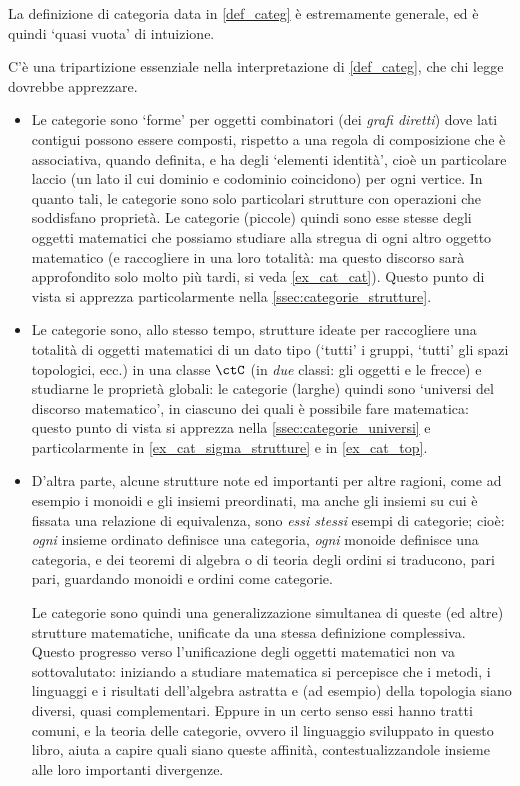 La definizione di categoria data in \ref{def_categ} è estremamente generale, ed è quindi `quasi vuota' di intuizione.

C'è una tripartizione essenziale nella interpretazione di \ref{def_categ}, che chi legge dovrebbe apprezzare.
\begin{itemize}
 \item Le categorie sono `forme' per oggetti combinatori (dei \emph{grafi diretti}) dove lati contigui possono essere composti, rispetto a una regola di composizione che è associativa, quando definita, e ha degli `elementi identità', cioè un particolare laccio (un lato il cui dominio e codominio coincidono) per ogni vertice. In quanto tali, le categorie sono solo particolari strutture con operazioni che soddisfano proprietà. Le categorie (piccole) quindi sono esse stesse degli oggetti matematici che possiamo studiare alla stregua di ogni altro oggetto matematico (e raccogliere in una loro totalità: ma questo discorso sarà approfondito solo molto più tardi, si veda \ref{ex_cat_cat}). Questo punto di vista si apprezza particolarmente nella \autoref{ssec:categorie_strutture}.
 \item Le categorie sono, allo stesso tempo, strutture ideate per raccogliere una totalità di oggetti matematici di un dato tipo (`tutti' i gruppi, `tutti' gli spazi topologici, ecc.) in una classe \(\ctC\) (in \emph{due} classi: gli oggetti e le frecce) e studiarne le proprietà globali: le categorie (larghe) quindi sono `universi del discorso matematico', in ciascuno dei quali è possibile fare matematica: questo punto di vista si apprezza nella \autoref{ssec:categorie_universi} e particolarmente in \ref{ex_cat_sigma_strutture} e in \ref{ex_cat_top}.
 \item D'altra parte, alcune strutture note ed importanti per altre ragioni, come ad esempio i monoidi e gli insiemi preordinati, ma anche gli insiemi su cui è fissata una relazione di equivalenza, sono \emph{essi stessi} esempi di categorie; cioè: \emph{ogni} insieme ordinato definisce una categoria, \emph{ogni} monoide definisce una categoria, e dei teoremi di algebra o di teoria degli ordini si traducono, pari pari, guardando monoidi e ordini come categorie.

       Le categorie sono quindi una generalizzazione simultanea di queste (ed altre) strutture matematiche, unificate da una stessa definizione complessiva. Questo progresso verso l'unificazione degli oggetti matematici non va sottovalutato: iniziando a studiare matematica si percepisce che i metodi, i linguaggi e i risultati dell'algebra astratta e (ad esempio) della topologia siano diversi, quasi complementari. Eppure in un certo senso essi hanno tratti comuni, e la teoria delle categorie, ovvero il linguaggio sviluppato in questo libro, aiuta a capire quali siano queste affinità, contestualizzandole insieme alle loro importanti divergenze.
\end{itemize}

